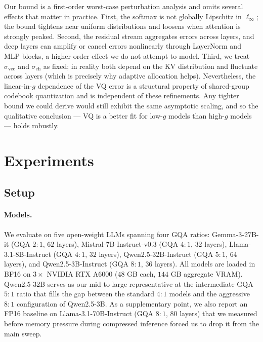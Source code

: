 \documentclass[11pt]{article}
\begin{document}
Our bound is a first-order worst-case perturbation analysis and omits several
effects that matter in practice. First, the softmax is not globally
Lipschitz in $\ell_\infty$; the bound tightens near uniform distributions and
loosens when attention is strongly peaked. Second, the residual stream
aggregates errors across layers, and deep layers can amplify or cancel errors
nonlinearly through LayerNorm and MLP blocks, a higher-order effect we do not
attempt to model. Third, we treat $\sigma_{\mathrm{vec}}$ and
$\sigma_{\mathrm{ch}}$ as fixed; in reality both depend on the KV
distribution and fluctuate across layers (which is precisely why adaptive
allocation helps). Nevertheless, the linear-in-$g$ dependence of the VQ
error is a structural property of shared-group codebook quantization and is
independent of these refinements. Any tighter bound we could derive would
still exhibit the same asymptotic scaling, and so the qualitative conclusion
--- VQ is a better fit for low-$g$ models than high-$g$ models --- holds
robustly.


\section{Experiments}
\label{sec:experiments}

\subsection{Setup}

\paragraph{Models.} We evaluate on five open-weight LLMs spanning four GQA ratios: Gemma-3-27B-it (GQA $2{:}1$, $62$ layers), Mistral-7B-Instruct-v0.3 (GQA $4{:}1$, $32$ layers), Llama-3.1-8B-Instruct (GQA $4{:}1$, $32$ layers), Qwen2.5-32B-Instruct (GQA $5{:}1$, $64$ layers), and Qwen2.5-3B-Instruct (GQA $8{:}1$, $36$ layers). All models are loaded in BF16 on $3\times$ NVIDIA RTX A6000 ($48$ GB each, $144$ GB aggregate VRAM). Qwen2.5-32B serves as our mid-to-large representative at the intermediate GQA $5{:}1$ ratio that fills the gap between the standard $4{:}1$ models and the aggressive $8{:}1$ configuration of Qwen2.5-3B. As a supplementary point, we also report an FP16 baseline on Llama-3.1-70B-Instruct (GQA $8{:}1$, $80$ layers) that we measured before memory pressure during compressed inference forced us to drop it from the main sweep.
\end{document}
